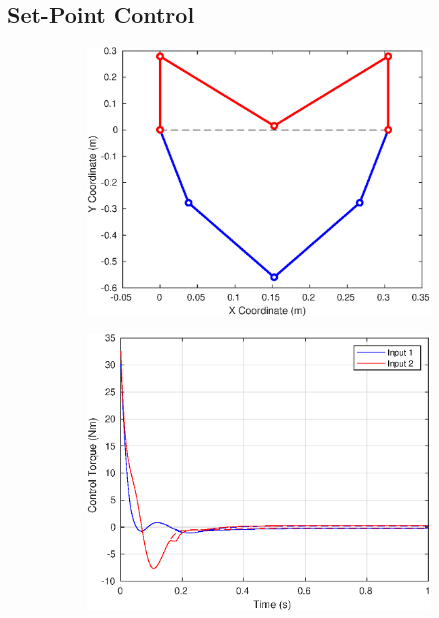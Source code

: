 \documentclass[10pt,final,journal,letterpaper,oneside,twocolumn]{IEEEtran}
\newcounter{mytempcntr}
\begin{document}
\subsection{Set-Point Control}
\label{sec:set-point-control-1}

\begin{figure}[!h]
  \centering
  \centering
  \begin{subfigure}[!t]{0.5\linewidth}
    \centering
    \includegraphics[width=0.7\linewidth]{./FIGS/SETPOINTOBJ}
    \caption{}
    \label{fig:setptobj}
  \end{subfigure}%
  \begin{subfigure}[!t]{0.5\linewidth}
    \centering
    \includegraphics[width=0.7\linewidth]{./FIGS/SETPT_3}
    \caption{}
    \label{fig:setpt3}
  \end{subfigure}
  

\end{figure}
\end{document}
